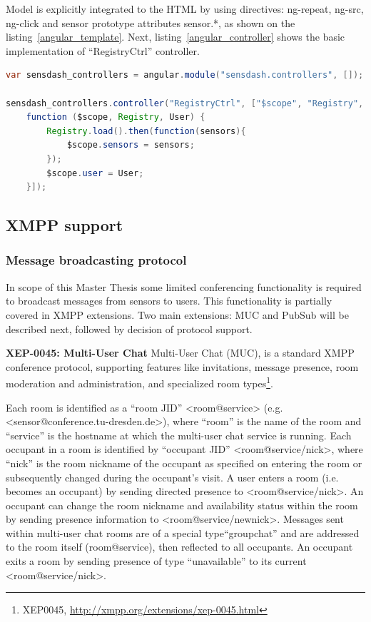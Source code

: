Model is explicitly integrated to the HTML by using directives: ng-repeat, ng-src, ng-click and sensor prototype attributes {{sensor.*}}, as shown on the listing~\ref{angular_template}. Next, listing~\ref{angular_controller} shows the basic implementation of ``RegistryCtrl'' controller.

	\begin{lstlisting}[language=java,label=angular_controller,caption=Registry Controller]
var sensdash_controllers = angular.module("sensdash.controllers", []);

sensdash_controllers.controller("RegistryCtrl", ["$scope", "Registry", "User",
    function ($scope, Registry, User) {
        Registry.load().then(function(sensors){
            $scope.sensors = sensors;
        });
        $scope.user = User;
    }]);
    \end{lstlisting}


\subsection{XMPP support}

\subsubsection{Message broadcasting protocol}
In scope of this Master Thesis some limited conferencing functionality is required to broadcast messages from sensors to users. This functionality is partially covered in XMPP extensions. Two main extensions: MUC and PubSub will be described next, followed by decision of protocol support.

\textbf{XEP-0045: Multi-User Chat}
\newline
Multi-User Chat (MUC), is a standard XMPP conference protocol, supporting features like invitations, message presence, room moderation and administration, and specialized room types\footnote{XEP0045, \url{http://xmpp.org/extensions/xep-0045.html}}.

Each room is identified as a ``room JID'' <room@service> (e.g. <sensor@conference.tu-dresden.de>), where ``room'' is the name of the room and ``service'' is the hostname at which the multi-user chat service is running. Each occupant in a room is identified by ``occupant JID'' <room@service/nick>, where ``nick'' is the room nickname of the occupant as specified on entering the room or subsequently changed during the occupant's visit. A user enters a room (i.e. becomes an occupant) by sending directed presence to <room@service/nick>. An occupant can change the room nickname and availability status within the room by sending presence information to <room@service/newnick>. Messages sent within multi-user chat rooms are of a special type``groupchat'' and are addressed to the room itself (room@service), then reflected to all occupants. An occupant exits a room by sending presence of type ``unavailable'' to its current <room@service/nick>.

